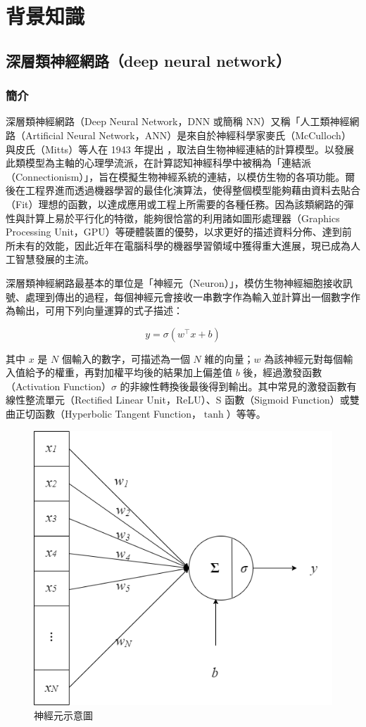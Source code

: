 \chapter{背景知識}

\section{深層類神經網路（deep neural network）}

\subsection{簡介}

深層類神經網路（Deep Neural Network，DNN 或簡稱 NN）又稱「人工類神經網路（Artificial Neural Network，ANN）是來自於神經科學家麥氏（McCulloch）與皮氏（Mitts）等人在 1943 年提出 \cite{mcculloch1943logical}，取法自生物神經連結的計算模型。以發展此類模型為主軸的心理學流派，在計算認知神經科學中被稱為「連結派（Connectionism）」，旨在模擬生物神經系統的連結，以模仿生物的各項功能。爾後在工程界進而透過機器學習的最佳化演算法，使得整個模型能夠藉由資料去貼合（Fit）理想的函數，以達成應用或工程上所需要的各種任務。因為該類網路的彈性與計算上易於平行化的特徵，能夠很恰當的利用諸如圖形處理器（Graphics Processing Unit，GPU）等硬體裝置的優勢，以求更好的描述資料分佈、達到前所未有的效能，因此近年在電腦科學的機器學習領域中獲得重大進展，現已成為人工智慧發展的主流。

深層類神經網路最基本的單位是「神經元（Neuron）」，模仿生物神經細胞接收訊號、處理到傳出的過程，每個神經元會接收一串數字作為輸入並計算出一個數字作為輸出，可用下列向量運算的式子描述：

$$y=\sigma(w^\top x + b) $$

其中 $x$ 是 $N$ 個輸入的數字，可描述為一個 $N$ 維的向量；$w$ 為該神經元對每個輸入值給予的權重，再對加權平均後的結果加上偏差值 $b$ 後，經過激發函數（Activation Function）$\sigma$ 的非線性轉換後最後得到輸出。其中常見的激發函數有線性整流單元（Rectified Linear Unit，ReLU）、S 函數（Sigmoid Function）或雙曲正切函數（Hyperbolic Tangent Function，$\tanh$）等等。

\begin{figure}

\centering

\includegraphics[width=0.5\linewidth]{figures/neuron.drawio.png}

\caption{神經元示意圖}

\label{fig:single-neuron}

\end{figure}

